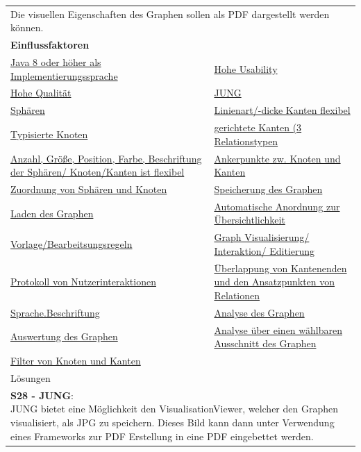 \documentclass[enabledeprecatedfontcommands,fontsize=11pt,paper=a4,twoside]{scrartcl}
\newcounter{one}
\begin{document}
	\newpage
	\begin{tabular} {|p{8cm} p{8cm}|}
		\hline
		\rowcolor{prob}\multicolumn{2}{|l|}{\parbox{16cm}{\textbf{10: PDF Erstellung}}} \\  \hline\hline 
		\multicolumn{2}{|l|}{\parbox{16cm}{Die visuellen Eigenschaften des Graphen sollen als PDF dargestellt werden können.}}\rule{0pt}{1ex}\\ \hline
		\multicolumn{2}{|l|}{\textbf{Einflussfaktoren}}\\
		\hyperlink{b}{Java 8 oder höher als Implementierungssprache} &  
		\hyperlink {g}{Hohe Usability}\\
		\hyperlink {h}{Hohe Qualität} &
		\hyperlink {k}{JUNG} \\
		\hyperlink {n}{Sphären} &
		\hyperlink {o}{Linienart/-dicke Kanten flexibel}\\
		\hyperlink {p}{Typisierte Knoten} &
		\hyperlink {q}{gerichtete Kanten (3 Relationstypen} \\
		\hyperlink {r}{Anzahl, Größe, Position, Farbe, Beschriftung der Sphären/ Knoten/Kanten ist flexibel} &
		\hyperlink {s}{Ankerpunkte zw. Knoten und Kanten} \\
		\hyperlink {t}{Zuordnung von Sphären und Knoten} &
		\hyperlink {v}{Speicherung des Graphen} \\
		\hyperlink {w}{Laden des Graphen} &
		\hyperlink {x}{Automatische Anordnung zur Übersichtlichkeit} \\
		\hyperlink {y}{Vorlage/Bearbeitsungsregeln} &
		\hyperlink {aa}{Graph Visualisierung/ Interaktion/ Editierung}\\
		\hyperlink {bb}{Protokoll von Nutzerinteraktionen} &
		\hyperlink {cc}{Überlappung von Kantenenden und den Ansatzpunkten von Relationen} \\
		\hyperlink {hh}{Sprache.Beschriftung} &
		\hyperlink {oo}{Analyse des Graphen} \\
		\hyperlink {pp}{Auswertung des Graphen} &
		\hyperlink {rr}{Analyse über einen wählbaren Ausschnitt des Graphen} \\ 
		\hyperlink {ss}{Filter von Knoten und Kanten} &
		\\ \hline
		\multicolumn{2}{|l|}{Lösungen} \\
		\multicolumn{2}{|l|}{\parbox{16cm}{
				\textbf{S28 - JUNG}: \\
				JUNG bietet eine Möglichkeit den VisualisationViewer, welcher den Graphen visualisiert, als JPG zu speichern. Dieses Bild kann dann unter Verwendung eines Frameworks zur PDF Erstellung in eine PDF eingebettet werden. \\
}}
\end{tabular}
\end{document}
